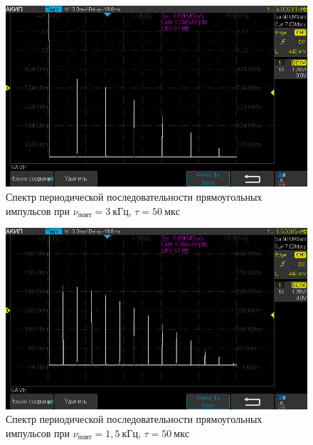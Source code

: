 \documentclass[a4paper, 12pt]{article}
\begin{document}
\begin{figure}[h!]
\begin{flushleft}
    \includegraphics[scale=0.5]{AKIP0003.png}
\end{flushleft}
\caption{Спектр периодической последовательности прямоугольных импульсов при \newline $\nu_{повт} = 3~кГц$, $\tau = 50~мкс$}
\label{ris9}
\end{figure}

\begin{figure}[h!]
\begin{flushleft}
    \includegraphics[scale=0.5]{AKIP0004.png}
\end{flushleft}
\caption{Спектр периодической последовательности прямоугольных импульсов при \newline $\nu_{повт} = 1,5~кГц$, $\tau = 50~мкс$}
\label{ris10}
\end{figure}
\end{document}
